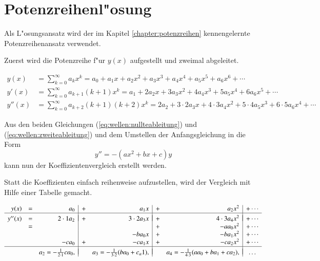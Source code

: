 \section{Potenzreihenl"osung}
Als L"osungsansatz wird der im Kapitel \ref{chapter:potenzreihen} 
kennengelernte Potenzreihenansatz verwendet.

Zuerst wird die Potenzreihe f"ur $y(x)$ aufgestellt und zweimal abgeleitet.

\begin{align}
	y(x)
	&=
	\sum_{k = 0}^{\infty} a_{k}x^k
	=
	a_0 + a_1x + a_2x^2 + a_3x^3 + a_4x^4 + a_5x^5 + a_6x^6 + \dotsb
	\label{eq:wellen:nullteableitung}
	\\
	y'(x)
	&=
	\sum_{k=0}^{\infty} a_{k+1}(k+1)x^k
	=
	a_1 + 2a_2x + 3a_3x^2 + 4a_4x^3 + 5a_5x^4 + 6a_6x^5+ \dotsb
	\label{eq:wellen:ersteableitung}
	\\
	y''(x)
	&=
	\sum_{k = 0}^{\infty} a_{k+2}(k+1)(k+2)x^k
	=
	2a_2 + 3 \mathbin{\cdot} 2a_3x + 4 \mathbin{\cdot} 3a_4x^2 + 5 
	\mathbin{\cdot} 4a_5x^3 + 6 \mathbin{\cdot} 5a_6x^4 + \dotsb
	\label{eq:wellen:zweiteableitung}
\end{align}
 
Aus den beiden Gleichungen (\ref{eq:wellen:nullteableitung}) und
(\ref{eq:wellen:zweiteableitung}) und dem Umstellen der Anfangsgleichung in die 
Form
\begin{equation*}
	y'' = -(ax^2+bx+c)y
\end{equation*}
kann nun der Koeffizientenvergleich erstellt werden. 

Statt die Koeffizienten einfach reihenweise aufzustellen, wird der Vergleich 
mit Hilfe einer Tabelle gemacht.

\begin{equation}
	\begin{array}{r c r | c r | c r | c r c}
	y(x) & = &
	a_0 & + & a_1x & + & a_2x^2 & + \dotsb
	\\
	\hline&&&&&&&\\[-2ex]
	y''(x) & = &
	2\cdot1 a_2 & + & 3\cdot2 a_3x & + & 4\cdot3 a_4x^2 & + \dotsb
	\\
	& = &
	& & & + &- aa_0x^2 & + \dotsb
	\\
	& &
	& &- ba_0x & + &- ba_1x^2 & + \dotsb
	\\
	& &
	-ca_0 & + &- ca_1x & + &- ca_2x^2 & + \dotsb
	\\
	\hline&&&&&&&\\[-2ex]
	& &
	a_2 = -\frac{1}{2 \cdot 1}ca_0,
	& & a_3 = -\frac{1}{3 \cdot 2}(ba_0+c_a1),
	& & a_4 = -\frac{1}{4 \cdot 3}(aa_0+ba_1+ca_2),
	& \dots
	\end{array}
	\label{eq:wellen:koeffizietenvergleichtabelle}
\end{equation}

